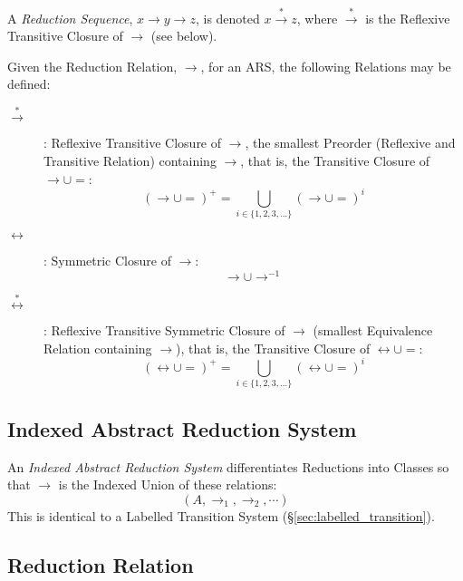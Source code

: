 A \emph{Reduction Sequence}, $x \rightarrow y \rightarrow z$, is
denoted $x \stackrel{*}\rightarrow z$, where $\stackrel{*}\rightarrow$
is the Reflexive Transitive Closure of $\rightarrow$ (see below).

Given the Reduction Relation, $\rightarrow$, for an ARS, the following
Relations may be defined:

\begin{description}

\item [$\stackrel{*}\rightarrow$]: Reflexive Transitive Closure of
  $\rightarrow$, the smallest Preorder (Reflexive and Transitive
  Relation) containing $\rightarrow$, that is, the Transitive Closure
  of $\rightarrow \cup =$:
  \[ (\rightarrow \cup =)^+ =
  \bigcup_{i \in \{1,2,3,...\}} (\rightarrow \cup =)^i \]

\item [$\leftrightarrow$]: Symmetric Closure of $\rightarrow$:
  \[ \rightarrow \cup \rightarrow^{-1} \]

\item [$\stackrel{*}\leftrightarrow$]: Reflexive Transitive
  Symmetric Closure of $\rightarrow$ (smallest Equivalence Relation
  containing $\rightarrow$), that is, the Transitive Closure of
  $\leftrightarrow \cup =$:
  \[ (\leftrightarrow \cup =)^+ =
  \bigcup_{i \in \{1,2,3,...\}} (\leftrightarrow \cup =)^i \]

\end{description}



\subsection{Indexed Abstract Reduction System}
\label{sec:indexed_rewrite}

An \emph{Indexed Abstract Reduction System} differentiates Reductions
into Classes so that $\rightarrow$ is the Indexed Union of these
relations:
\[
  (A, \rightarrow_1, \rightarrow_2, \cdots)
\]
This is identical to a Labelled Transition System
(\S\ref{sec:labelled_transition}).



\subsection{Reduction Relation}\label{sec:reduction_relation}

